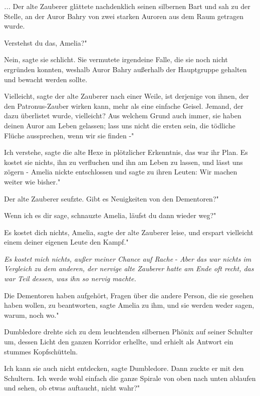 \emph{...}
Der alte Zauberer glättete nachdenklich seinen silbernen Bart und sah zu der
Stelle, an der Auror Bahry von zwei starken Auroren aus dem Raum getragen wurde.

\glqq Verstehst du das, Amelia?"

\glqq Nein\grqq{}, sagte sie schlicht. Sie vermutete irgendeine Falle, die sie
noch nicht ergründen konnten, weshalb Auror Bahry außerhalb der Hauptgruppe
gehalten und bewacht werden sollte.

\glqq Vielleicht\grqq{}, sagte der alte Zauberer nach einer Weile, \glqq ist
derjenige von ihnen, der den Patronus-Zauber wirken kann, mehr als eine einfache
Geisel. Jemand, der dazu überlistet wurde, vielleicht? Aus welchem Grund auch
immer, sie haben deinen Auror am Leben gelassen; lass uns nicht die ersten sein,
die tödliche Flüche aussprechen, wenn wir sie finden -"

\glqq Ich verstehe\grqq{}, sagte die alte Hexe in plötzlicher Erkenntnis, \glqq
das war ihr Plan. Es kostet sie nichts, ihn zu verfluchen und ihn am Leben zu
lassen, und lässt uns zögern -\grqq{} Amelia nickte entschlossen und sagte zu
ihren Leuten: \glqq Wir machen weiter wie bisher."

Der alte Zauberer seufzte. \glqq Gibt es Neuigkeiten von den Dementoren?"

\glqq Wenn ich es dir sage\grqq{}, schnauzte Amelia, \glqq läufst du dann wieder
weg?"

\glqq Es kostet dich nichts, Amelia\grqq{}, sagte der alte Zauberer leise, \glqq
und erspart vielleicht einem deiner eigenen Leute den Kampf."

\emph{Es kostet mich nichts, außer meiner Chance auf Rache }- \emph{Aber das war
nichts im Vergleich zu dem anderen, der nervige alte Zauberer hatte am Ende oft
recht, das war Teil dessen, was ihn so nervig machte.}

\glqq Die Dementoren haben aufgehört, Fragen über die andere Person, die sie
gesehen haben wollen, zu beantworten\grqq{}, sagte Amelia zu ihm, \glqq und sie
werden weder sagen, warum, noch wo."

Dumbledore drehte sich zu dem leuchtenden silbernen Phönix auf seiner Schulter
um, dessen Licht den ganzen Korridor erhellte, und erhielt als Antwort ein
stummes Kopfschütteln.

\glqq Ich kann sie auch nicht entdecken\grqq{}, sagte Dumbledore. Dann zuckte er
mit den Schultern. \glqq Ich werde wohl einfach die ganze Spirale von oben nach
unten ablaufen und sehen, ob etwas auftaucht, nicht wahr?"

